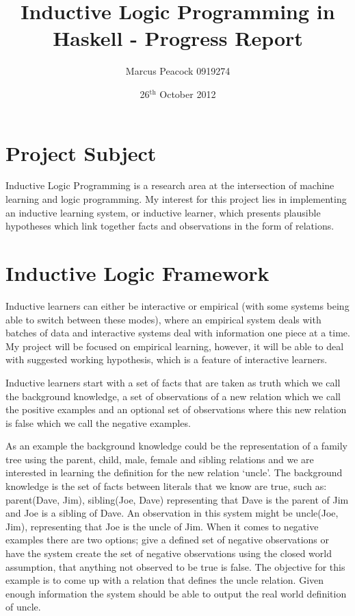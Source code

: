 \documentclass{article}
\title{Inductive Logic Programming in Haskell - Progress Report}
\author{Marcus Peacock 0919274}
\date{26$^{\textrm{th}}$ October 2012}
\begin{document}
\maketitle

\section*{Project Subject}

Inductive Logic Programming is a research area at the intersection of machine
learning and logic programming. My interest for this project lies in
implementing an inductive learning system, or inductive learner, which presents plausible hypotheses which link together facts and observations in the form of relations.

\section*{Inductive Logic Framework}

Inductive learners can either be interactive or empirical (with some systems
being able to switch between these modes), where an empirical system deals with
batches of data and interactive systems deal with information one piece at a
time. My project will be focused on empirical learning, however, it will be
able to deal with suggested working hypothesis, which is a feature of
interactive learners.

Inductive learners start with a set of facts that are taken as truth which we
call the background knowledge, a set of observations of a new relation which we
call the positive examples and an optional set of observations where this new
relation is false which we call the negative examples.

As an example the background knowledge could be
the representation of a family tree using the parent, child, male, female and sibling
relations and we are interested in learning the definition for the new relation
`uncle'. The background knowledge is the set of facts between literals that we
know are true, such as: parent(Dave, Jim), sibling(Joe, Dave)
representing that Dave is the parent of Jim and Joe is a sibling of
Dave. An observation in this system might be uncle(Joe, Jim),
    representing that Joe is the uncle of Jim. When it comes to negative
    examples there are two options; give a defined set of negative observations
    or have the system create the set of negative observations using the closed
    world assumption, that anything not observed to be true is false. The
    objective for this example is to come up with a relation that defines the
    uncle relation. Given enough information the system should be able to
    output the real world definition of uncle.
\end{document}
